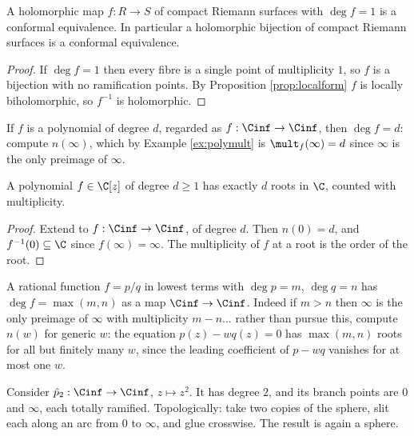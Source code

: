 \begin{corollary}\label{cor:degree1}
	A holomorphic map $f : R \to S$ of compact Riemann surfaces with $\deg f = 1$ is a
	conformal equivalence. In particular a holomorphic bijection of compact Riemann surfaces
	is a conformal equivalence.
\end{corollary}

\begin{proof}
	If $\deg f = 1$ then every fibre is a single point of multiplicity $1$, so $f$ is a
	bijection with no ramification points. By Proposition \ref{prop:localform} $f$ is
	locally biholomorphic, so $f^{-1}$ is holomorphic.
\end{proof}

\begin{example}
	If $f$ is a polynomial of degree $d$, regarded as $f : \Cinf\to\Cinf$, then $\deg f = d$:
	compute $n(\infty)$, which by Example \ref{ex:polymult} is $\mult_f(\infty) = d$ since
	$\infty$ is the only preimage of $\infty$.
\end{example}

\begin{corollary}
	A polynomial $f \in \C[z]$ of degree $d \geq 1$ has exactly $d$ roots in $\C$, counted
	with multiplicity.
\end{corollary}

\begin{proof}
	Extend to $f: \Cinf\to\Cinf$, of degree $d$. Then $n(0) = d$, and $f^{-1}(0) \subseteq \C$
	since $f(\infty)=\infty$. The multiplicity of $f$ at a root is the order of the root.
\end{proof}

\begin{example}
	A rational function $f = p/q$ in lowest terms with $\deg p = m$, $\deg q = n$ has
	$\deg f = \max(m,n)$ as a map $\Cinf\to\Cinf$. Indeed if $m > n$ then $\infty$ is the
	only preimage of $\infty$ with multiplicity $m - n$... rather than pursue this, compute
	$n(w)$ for generic $w$: the equation $p(z) - wq(z) = 0$ has $\max(m,n)$ roots for all
	but finitely many $w$, since the leading coefficient of $p - wq$ vanishes for at most
	one $w$.
\end{example}

\begin{example}\label{ex:2sheeted}
	Consider $\hat p_2 : \Cinf\to\Cinf$, $z\mapsto z^2$. It has degree $2$, and its
	branch points are $0$ and $\infty$, each totally ramified. Topologically: take two
	copies of the sphere, slit each along an arc from $0$ to $\infty$, and glue crosswise.
	The result is again a sphere.
\end{example}


